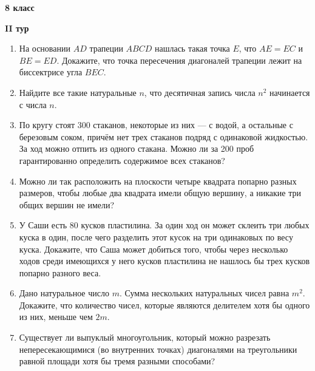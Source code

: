 \documentclass{article}
\begin{document}
    \large

    \begin{center}
        \LARGE\textbf{8 класс}
    \end{center}
    \begin{center}
        \large\textbf{II тур}
    \end{center}

    \begin{enumerate}[label*=\textbf{\arabic{enumi}.}]
        \setcounter{enumi}{0}
        \item На основании $AD$ трапеции $ABCD$ нашлась такая точка $E$, что $AE = EC$ и $BE = ED$.
        Докажите, что точка пересечения диагоналей трапеции лежит на биссектрисе угла $BEC$.

        \item Найдите все такие натуральные $n$, что десятичная запись числа $n^2$ начинается с числа $n$.

        \item По кругу стоят 300 стаканов, некоторые из них --- с водой, а остальные с березовым соком, причём нет трех стаканов подряд с одинаковой жидкостью.
        За ход можно отпить из одного стакана.
        Можно ли за 200 проб гарантированно определить содержимое всех стаканов?

        \item Можно ли так расположить на плоскости четыре квадрата попарно разных размеров, чтобы любые два квадрата имели общую вершину, а никакие три общих вершин не имели?

        \item У Саши есть 80 кусков пластилина.
        За один ход он может склеить три любых куска в один, после чего разделить этот кусок на три одинаковых по весу куска.
        Докажите, что Саша может добиться того, чтобы через несколько ходов среди имеющихся у него кусков пластилина не нашлось бы трех кусков попарно разного веса.

        \item Дано натуральное число $m$.
        Сумма нескольких натуральных чисел равна $m^2$.
        Докажите, что количество чисел, которые являются делителем хотя бы одного из них, меньше чем $2m$.

        \item Существует ли выпуклый многоугольник, который можно разрезать непересекающимися (во внутренних точках) диагоналями на треугольники равной площади хотя бы тремя разными способами?

    \end{enumerate}
\end{document}
